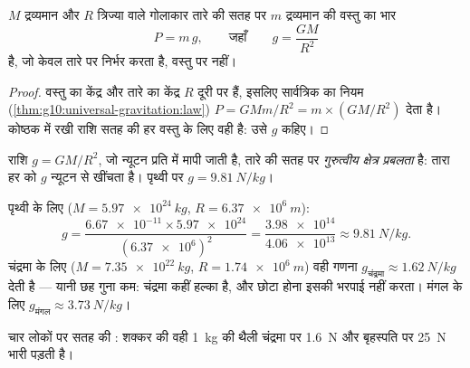 \begin{proposition}[किसी तारे की सतह पर भार]\label{prop:g10:universal-gravitation:surfaceg}
$M$ द्रव्यमान और $R$ त्रिज्या वाले गोलाकार तारे की सतह पर $m$
द्रव्यमान की वस्तु का भार
\[
P = m\,g,
\qquad\text{जहाँ}\qquad
g = \frac{G M}{R^2}
\]
है, जो केवल तारे पर निर्भर करता है, वस्तु पर नहीं।
\end{proposition}

\begin{proof}
वस्तु का केंद्र और तारे का केंद्र $R$ दूरी पर हैं, इसलिए सार्वत्रिक
 का नियम (\cref{thm:g10:universal-gravitation:law}) $P = G M m / R^2 = m \times \left(G M / R^2\right)$ देता है। कोष्ठक में रखी
राशि सतह की हर वस्तु के लिए वही है: उसे $g$ कहिए।
\end{proof}

\begin{definition}[गुरुत्वीय क्षेत्र प्रबलता]\label{def:g10:universal-gravitation:fieldstrength}
राशि $g = G M / R^2$, जो न्यूटन प्रति  में मापी जाती है, तारे
की सतह पर \emph{गुरुत्वीय क्षेत्र प्रबलता} है: तारा हर  को $g$ न्यूटन से खींचता है।
पृथ्वी पर $g = \qty{9.81}{N/kg}$।
\end{definition}

\begin{example}[$g$ निकालना]\label{ex:g10:universal-gravitation:gvalues}
पृथ्वी के लिए ($M = \qty{5.97e24}{kg}$, $R = \qty{6.37e6}{m}$):
\[
g = \frac{\num{6.67e-11} \times \num{5.97e24}}{(\num{6.37e6})^2}
= \frac{\num{3.98e14}}{\num{4.06e13}}
\approx \qty{9.81}{N/kg}.
\]
चंद्रमा के लिए ($M = \qty{7.35e22}{kg}$, $R = \qty{1.74e6}{m}$) वही गणना $g_{\text{चंद्रमा}} \approx \qty{1.62}{N/kg}$ देती है --- यानी छह
गुना कम: चंद्रमा कहीं हल्का है, और छोटा होना इसकी भरपाई नहीं करता। मंगल
के लिए $g_{\text{मंगल}} \approx \qty{3.73}{N/kg}$।
\end{example}

\begin{omfigure}

{\small चार लोकों पर सतह की : शक्कर की
वही \qty{1}{kg} की थैली चंद्रमा पर \qty{1.6}{N} और बृहस्पति पर \qty{25}{N} भारी पड़ती
है।}
\end{omfigure}

